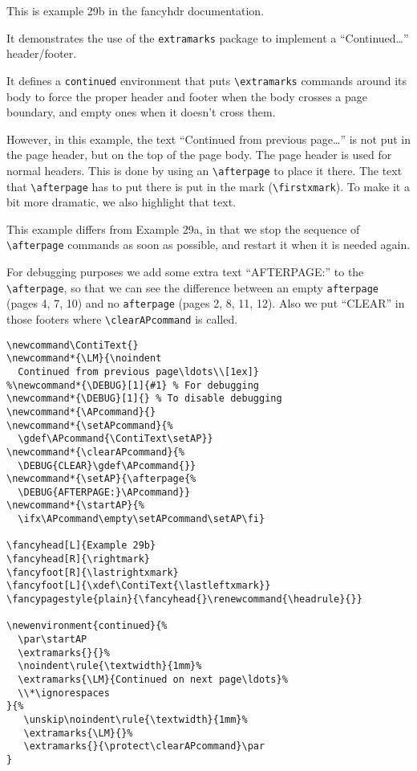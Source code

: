 \documentclass{report}
\newcommand\ContiText{}
\newcommand*{\LM}{\noindent
  Continued from previous page\ldots\\[1ex]}
\newcommand*{\DEBUG}[1]{} %
\newcommand*{\APcommand}{}
\newcommand*{\setAPcommand}{\gdef\APcommand{\ContiText\setAP}}
\newcommand*{\clearAPcommand}{\DEBUG{CLEAR}\gdef\APcommand{}}
\newcommand*{\setAP}{\afterpage{\DEBUG{AFTERPAGE:}\APcommand}}
\newcommand*{\startAP}{\ifx\APcommand\empty\setAPcommand\setAP\fi}
\begin{document}
\tableofcontents

\thispagestyle{plain}

\bigskip

\noindent
\begin{boxedminipage}{\textwidth}
\small
This is example 29b in the fancyhdr documentation.

It demonstrates the use of the \texttt{extramarks} package to implement
a ``Continued\ldots'' header/footer.

It defines a \texttt{continued} environment that puts \verb|\extramarks| commands around its body to force the proper header and footer when the body crosses a page boundary, and empty ones when it doesn't cross them.

However, in this example, the text ``Continued from previous page\ldots'' is not put in the page header, but on the top of the page body. The page header is used for normal headers. This is done by using an \verb|\afterpage| to place it there. The text that \verb|\afterpage| has to put there is put in the mark (\verb|\firstxmark|). To make it a bit more dramatic, we also highlight that text.

This example differs from Example 29a, in that we stop the sequence of \verb|\afterpage| commands as soon as possible, and restart it when it is needed again.
\end{boxedminipage}

\noindent
\begin{boxedminipage}{\textwidth}
\small
For debugging purposes we add some extra text ``AFTERPAGE:'' to the \verb|\afterpage|, so that we can see the difference between an empty \texttt{afterpage} (pages 4, 7, 10) and no \texttt{afterpage} (pages 2, 8, 11, 12). Also we put ``CLEAR'' in those footers where \verb|\clearAPcommand| is called.

\begin{verbatim}
\newcommand\ContiText{}
\newcommand*{\LM}{\noindent
  Continued from previous page\ldots\\[1ex]}
%\newcommand*{\DEBUG}[1]{#1} % For debugging
\newcommand*{\DEBUG}[1]{} % To disable debugging
\newcommand*{\APcommand}{}
\newcommand*{\setAPcommand}{%
  \gdef\APcommand{\ContiText\setAP}}
\newcommand*{\clearAPcommand}{%
  \DEBUG{CLEAR}\gdef\APcommand{}}
\newcommand*{\setAP}{\afterpage{%
  \DEBUG{AFTERPAGE:}\APcommand}}
\newcommand*{\startAP}{%
  \ifx\APcommand\empty\setAPcommand\setAP\fi}

\fancyhead[L]{Example 29b}
\fancyhead[R]{\rightmark}
\fancyfoot[R]{\lastrightxmark}
\fancyfoot[L]{\xdef\ContiText{\lastleftxmark}}
\fancypagestyle{plain}{\fancyhead{}\renewcommand{\headrule}{}}

\newenvironment{continued}{%
  \par\startAP
  \extramarks{}{}%
  \noindent\rule{\textwidth}{1mm}%
  \extramarks{\LM}{Continued on next page\ldots}%
  \\*\ignorespaces
}{%
   \unskip\noindent\rule{\textwidth}{1mm}%
   \extramarks{\LM}{}%
   \extramarks{}{\protect\clearAPcommand}\par
}
\end{verbatim}

\end{boxedminipage}
\end{document}
